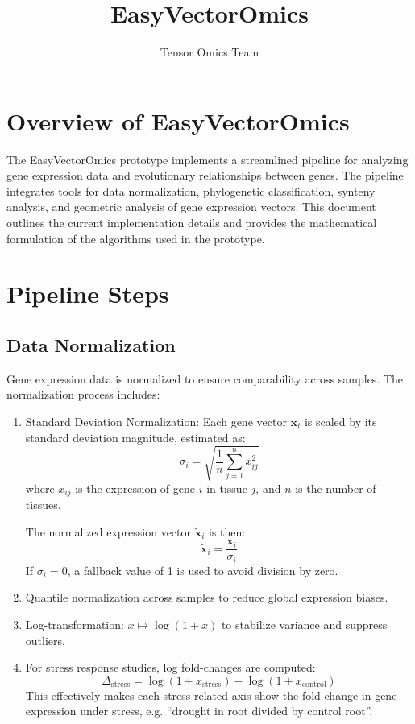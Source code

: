 \documentclass{article}
\title{EasyVectorOmics}
\author{Tensor Omics Team}
\begin{document}
\maketitle

\section{Overview of EasyVectorOmics}

The EasyVectorOmics prototype implements a streamlined pipeline for analyzing gene expression data and evolutionary relationships between genes. The pipeline integrates tools for data normalization, phylogenetic classification, synteny analysis, and geometric analysis of gene expression vectors. This document outlines the current implementation details and provides the mathematical formulation of the algorithms used in the prototype.

\section{Pipeline Steps}

\subsection{Data Normalization}
Gene expression data is normalized to ensure comparability across samples. The normalization process includes:
\begin{enumerate}
    \item Standard Deviation Normalization: Each gene vector $\mathbf{x}_i$ is scaled by its standard deviation magnitude, estimated as:
    \begin{equation}
    \sigma_i = \sqrt{\frac{1}{n} \sum_{j=1}^n x_{ij}^2}
    \end{equation}
    where $x_{ij}$ is the expression of gene $i$ in tissue $j$, and $n$ is the number of tissues.
    
    The normalized expression vector $\tilde{\mathbf{x}}_i$ is then:
    \begin{equation}
    \tilde{\mathbf{x}}_i = \frac{\mathbf{x}_i}{\sigma_i}
    \end{equation}
    If $\sigma_i = 0$, a fallback value of 1 is used to avoid division by zero.
    
    \item Quantile normalization across samples to reduce global expression biases.
    \item Log-transformation: \( x \mapsto \log(1 + x) \) to stabilize variance and suppress outliers.
    \item For stress response studies, log fold-changes are computed: 
    \[
        \Delta_{\text{stress}} = \log(1 + x_{\text{stress}}) - \log(1 + x_{\text{control}})
    \]
    This effectively makes each stress related axis show the fold change in
    gene expression under stress, e.g. ``drought in root divided by control
    root''.
    
\end{enumerate}
\end{document}
